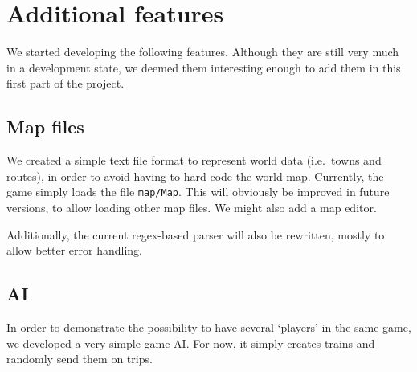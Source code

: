 \documentclass{article}
\begin{document}
\section{Additional features}
We started developing the following features. Although they are still very much in a development state,
we deemed them interesting enough to add them in this first part of the project.

\subsection{Map files}
We created a simple text file format to represent world data (i.e.\ towns and routes), 
in order to avoid having to hard code the world map.
Currently, the game simply loads the file \verb|map/Map|.
This will obviously be improved in future versions, to allow loading other map files.
We might also add a map editor.

Additionally, the current regex-based parser will also be rewritten,
mostly to allow better error handling.

\subsection{AI}
In order to demonstrate the possibility to have several `players' in the same game,
we developed a very simple game AI. For now, it simply creates trains and randomly send them on trips.
\end{document}
